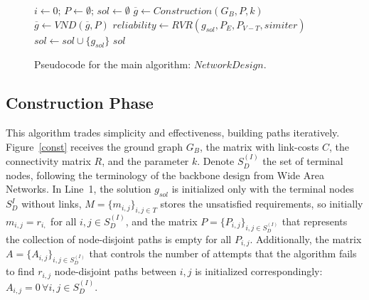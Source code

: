 \documentclass{llncs}
\begin{document}
\begin{figure}[H]
\begin{algorithm}[H]
\caption{$sol = NetworkDesign(G_B,iter,k,p_{min},P_E,P_{V-T},simiter)$}
\begin{algorithmic}[1]
\STATE $i \leftarrow 0; \, P \leftarrow \emptyset; \, sol \leftarrow \emptyset$
\STATE $\overline{g} \leftarrow Construction(G_B,P,k)$
\STATE $\overline{g} \leftarrow VND(\overline{g},P)$
\STATE $reliability \leftarrow RVR(g_{sol},P_E,P_{V-T},simiter)$
\STATE $sol \leftarrow sol \cup \{g_{sol}\}$
\ENDIF
\ENDWHILE
\RETURN $sol$
\end{algorithmic}
\end{algorithm}
\caption{Pseudocode for the main algorithm: $NetworkDesign$.\label{MainAlgorithm}}
\end{figure}

\subsection{Construction Phase}
This algorithm trades simplicity and effectiveness, building paths iteratively. 
Figure~\ref{const} receives the ground graph $G_B$, the matrix with link-costs $C$, 
the connectivity matrix $R$, and the parameter $k$. 
Denote $S_{D}^{(I)}$ the set of terminal nodes, following the terminology of the backbone design from Wide Area Networks. 
In Line~1, the solution $g_{sol}$ is initialized only with the terminal nodes $S_{D}^{I}$ 
without links, $M=\{m_{i,j}\}_{i,j\in T}$ stores the unsatisfied requirements, 
so initially $m_{i,j}=r_{i,}$ for all $i,j\in S_{D}^{(I)}$, and 
the matrix $P=\{P_{i,j}\}_{i,j\in S_{D}^{(I)}}$ that represents the collection of node-disjoint paths is empty for all $P_{i,j}$. Additionally, the matrix $A=\{A_{i,j}\}_{i,j\in S_{D}^{(I)}}$  that controls 
the number of attempts that the algorithm fails to find $r_{i,j}$ node-disjoint paths 
between $i,j$ is initialized correspondingly: $A_{i,j}=0\, \forall i, j \in S_{D}^{(I)}$. 
\end{document}
